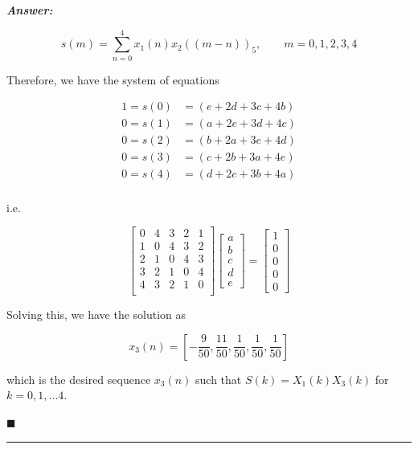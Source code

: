 \documentclass[12pt]{article}
\theoremstyle{definition}
\newenvironment{answer}{
    \textbf{\textit{Answer:}} \qquad
}{\hfill $\blacksquare$ \\ \begin{center}
    \rule{0.6\linewidth}{0.5px}    
\end{center}
}
\begin{document}
\begin{answer}
\begin{enumerate}
        $$
        s(m) = \sum_{n = 0}^{4} x_1(n) x_2\left( (m - n) \right)_5, \qquad m = 0, 1, 2, 3, 4
        $$

        Therefore, we have the system of equations

        \begin{align*}
            1 = s(0) & = (e + 2d + 3c + 4b)\\
            0 = s(1) & = (a + 2e + 3d + 4c)\\
            0 = s(2) & = (b + 2a + 3e + 4d)\\
            0 = s(3) & = (c + 2b + 3a + 4e)\\
            0 = s(4) & = (d + 2c + 3b + 4a)\\             
        \end{align*}

        i.e. 

        $$
        \begin{bmatrix}
            0 & 4 & 3 & 2 & 1\\
            1 & 0 & 4 & 3 & 2\\
            2 & 1 & 0 & 4 & 3\\
            3 & 2 & 1 & 0 & 4\\
            4 & 3 & 2 & 1 & 0\\
        \end{bmatrix} \begin{bmatrix}
            a \\ b\\ c\\ d\\ e
        \end{bmatrix} = \begin{bmatrix}
            1 \\ 0 \\ 0\\ 0 \\ 0
        \end{bmatrix}
        $$

        Solving this, we have the solution as 

        $$
        x_3(n) = \left[ -\dfrac{9}{50}, \dfrac{11}{50}, \dfrac{1}{50}, \dfrac{1}{50}, \dfrac{1}{50} \right]
        $$

        which is the desired sequence $x_3(n)$ such that $S(k) = X_1(k)X_3(k)$ for $k = 0, 1, \dots 4$.
    \end{enumerate}

\end{answer}
\end{document}
